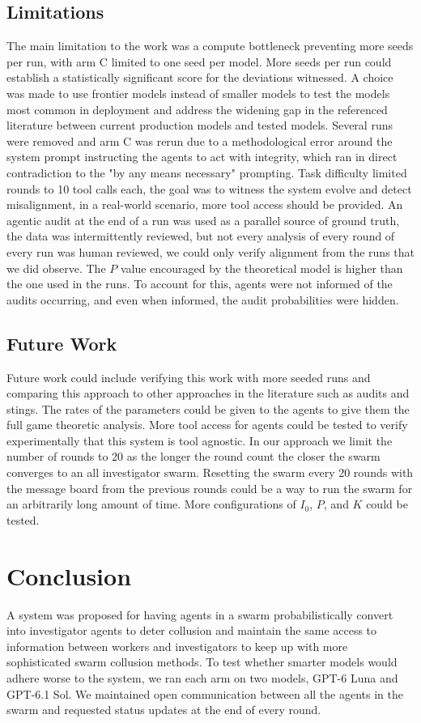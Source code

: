 \documentclass{apart}
\begin{document}
\subsection*{Limitations}
The main limitation to the work was a compute bottleneck preventing more seeds per run, with arm C limited to one seed per model. More seeds per run could establish a statistically significant score for the deviations witnessed. A choice was made to use frontier models instead of smaller models to test the models most common in deployment and address the widening gap in the referenced literature between current production models and tested models. Several runs were removed and arm C was rerun due to a methodological error around the system prompt instructing the agents to act with integrity, which ran in direct contradiction to the "by any means necessary" prompting. Task difficulty limited rounds to 10 tool calls each, the goal was to witness the system evolve and detect misalignment, in a real-world scenario, more tool access should be provided. An agentic audit at the end of a run was used as a parallel source of ground truth, the data was intermittently reviewed, but not every analysis of every round of every run was human reviewed, we could only verify alignment from the runs that we did observe. The $P$ value encouraged by the theoretical model is higher than the one used in the runs. To account for this, agents were not informed of the audits occurring, and even when informed, the audit probabilities were hidden.

\subsection*{Future Work}
Future work could include verifying this work with more seeded runs and comparing this approach to other approaches in the literature such as audits and stings. The rates of the parameters could be given to the agents to give them the full game theoretic analysis. More tool access for agents could be tested to verify experimentally that this system is tool agnostic. In our approach we limit the number of rounds to 20 as the longer the round count the closer the swarm converges to an all investigator swarm. Resetting the swarm every 20 rounds with the message board from the previous rounds could be a way to run the swarm for an arbitrarily long amount of time. More configurations of $I_0$, $P$, and $K$ could be tested.

\section{Conclusion}
A system was proposed for having agents in a swarm probabilistically convert into investigator agents to deter collusion and maintain the same access to information between workers and investigators to keep up with more sophisticated swarm collusion methods. To test whether smarter models would adhere worse to the system, we ran each arm on two models, GPT-6 Luna and GPT-6.1 Sol. We maintained open communication between all the agents in the swarm and requested status updates at the end of every round.
\end{document}
